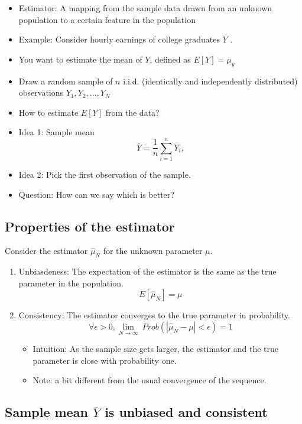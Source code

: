 \documentclass[]{book}
\providecommand{\tightlist}{%
  \setlength{\itemsep}{0pt}\setlength{\parskip}{0pt}}
\begin{document}
\begin{itemize}
\tightlist
\item
  Estimator: A mapping from the sample data drawn from an unknown
  population to a certain feature in the population
\item
  Example: Consider hourly earnings of college graduates \(Y\) .
\item
  You want to estimate the mean of \(Y\), defined as \(E[Y] = \mu_y\)
\item
  Draw a random sample of \(n\) i.i.d. (identically and independently
  distributed) observations \({ Y_1, Y_2, \ldots, Y_N }\)
\item
  How to estimate \(E[Y]\) from the data?
\item
  Idea 1: Sample mean \[ 
    \bar{Y} = \frac{1}{n} \sum_{i=1}^n Y_i, 
  \]
\item
  Idea 2: Pick the first observation of the sample.
\item
  Question: How can we say which is better?
\end{itemize}

\subsection{Properties of the
estimator}\label{properties-of-the-estimator}

Consider the estimator \(\hat{\mu}_N\) for the unknown parameter
\(\mu\).

\begin{enumerate}
\def\labelenumi{\arabic{enumi}.}
\item
  Unbiasdeness: The expectation of the estimator is the same as the true
  parameter in the population. \[
    E[\hat{\mu}_N] = \mu
  \]
\item
  Consistency: The estimator converges to the true parameter in
  probability. \[
  \forall \epsilon >0, \lim_{N \rightarrow \infty} \ Prob(|\hat{\mu}_{N}-\mu|<\epsilon)=1
  \]

  \begin{itemize}
  \tightlist
  \item
    Intuition: As the sample size gets larger, the estimator and the
    true parameter is close with probability one.
  \item
    Note: a bit different from the usual convergence of the sequence.
  \end{itemize}
\end{enumerate}

\subsection{\texorpdfstring{Sample mean \(\bar{Y}\) is unbiased and
consistent}{Sample mean \textbackslash{}bar\{Y\} is unbiased and consistent}}\label{sample-mean-bary-is-unbiased-and-consistent}
\end{document}
